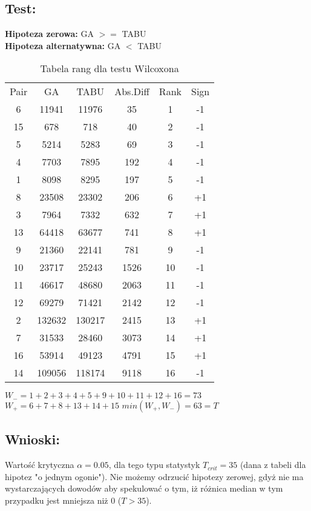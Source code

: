   \subsection{Test: }
    \textbf{Hipoteza zerowa: } GA $>=$ TABU \\
    \textbf{Hipoteza alternatywna: } GA $<$ TABU \\
    \begin{table}[!ht]
      \centering
      \begin{tabular}{| c | c | c | c | c | c |}
        \hline
        Pair & GA & TABU & Abs.Diff & Rank & Sign \\
        6 & 11941 & 11976 & 35 & 1 & -1 \\
        15 & 678 & 718 & 40 & 2 & -1 \\
        5 & 5214 & 5283 & 69 & 3 & -1 \\
        4 & 7703 & 7895 & 192 & 4 & -1 \\
        1 & 8098 & 8295 & 197 & 5 & -1 \\
        8 & 23508 & 23302 & 206 & 6 & +1 \\
        3 & 7964 & 7332 & 632 & 7 & +1 \\
        13 & 64418 & 63677 & 741 & 8 & +1 \\
        9 & 21360 & 22141 & 781 & 9 & -1 \\
        10 & 23717 & 25243 & 1526 & 10 & -1 \\
        11 & 46617 & 48680 & 2063 & 11 & -1 \\
        12 & 69279 & 71421 & 2142 & 12 & -1 \\
        2 & 132632 & 130217 & 2415 & 13 & +1 \\
        7 & 31533 & 28460 & 3073 & 14 & +1 \\
        16 & 53914 & 49123 & 4791 & 15 & +1 \\
        14 & 109056 & 118174 & 9118 & 16 & -1 \\
        \hline
          
      \end{tabular}
      \caption{Tabela rang dla testu Wilcoxona}
      $W_{-} = 1+2+3+4+5+9+10+11+12+16=73$
      $W_{+} = 6+7+8+13+14+15 $
      $min(W_{+},W_{-}) = 63 = T$
  
    \end{table}
  \subsection{Wnioski: }
    Wartość krytyczna $\alpha = 0.05$, dla tego typu statystyk $T_{crit} = 35$ (dana z tabeli dla hipotez "o jednym ogonie").
    Nie możemy odrzucić hipotezy zerowej, gdyż nie ma wystarczających dowodów aby spekulować o tym, iż różnica median w tym przypadku jest mniejsza niż 0 ($ T > 35$).